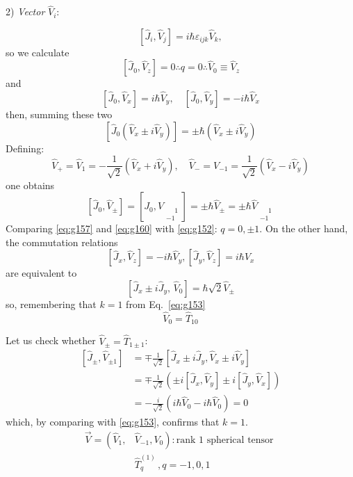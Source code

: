 \documentclass[12pt]{article}
\newcommand{\be}{\begin{equation}}
\newcommand{\ee}{\end{equation}}
\begin{document}

2) \emph{Vector} $\hat{V}_i$:

\[\left[\hat{J}_{i}, \hat{V}_{j}\right]=i \hbar \varepsilon_{i j k} \hat{V}_{k},\]
so we calculate
\be
\left[\hat{J}_{0}, \hat{V}_{z}\right]=0 \therefore q=0 \therefore \hat{V}_{0} \equiv \hat{V}_{z}
\label{eq:g157}
\ee
and
\be
\left[\hat{J}_{0}, \hat{V}_{x}\right]= i \hbar \hat{V}_{y},\quad
\left[\hat{J}_{0}, \hat{V}_{y}\right]=-i \hbar \hat{V}_{x}
\ee
then, summing these two
\be
\left[\hat{J}_{0}\left(\hat{V}_{x} \pm i \hat{V}_{y}\right)\right]=\pm \hbar\left(\hat{V}_{x} \pm i \hat{V}_{y}\right)
\ee
Defining:
\be
\hat{V}_{+}=\hat{V}_{1}=-\frac{1}{\sqrt{2}}\left(\hat{V}_{x}+i \hat{V}_{y}\right), \quad \hat{V}_{-}=V_{-1}=\frac{1}{\sqrt{2}}\left(\hat{V}_{x}-i \hat{V}_{y}\right)
\label{eq:g160}
\ee
one obtains
\be
\left[\hat{J}_{0}, \hat{V}_{\pm}\right]=\left[J_{0}, V_{\substack{\phantom{-}1\\-1}}\right]=\pm \hbar \hat{V}_{\pm}=\pm \hbar \hat{V}_{\substack{\phantom{-}1\\-1}}
\ee
Comparing \eqref{eq:g157} and \eqref{eq:g160} with \eqref{eq:g152}: $\boxed{q=0,\pm 1}$.
On the other hand, the commutation relations
\[
\left[\hat{J}_{x}, \hat{V}_{z}\right]=-i \hbar \hat{V}_{y},\left[\hat{J}_{y}, \hat{V}_{z}\right]=i \hbar \hat{V}_{x}
\]
are equivalent to
\be
\left[\hat{J}_{x} \pm i \hat{J}_{y}, \, \hat{V}_{0}\right]=\hbar \sqrt{2} \hat{V}_{\pm}
\ee
so, remembering that \emph{$k=1$} from Eq.~\eqref{eq:g153}
\be
\boxed{\hat{V}_{0}=\hat{T}_{10}}
\ee


Let us check whether $\hat{V}_{\pm}=\hat{T}_{1 \pm 1}$:
\be
\begin{aligned} 
{\left[\hat{J}_{\pm}, \hat{V}_{\pm 1}\right] } 
&=\mp \frac{1}{\sqrt{2}}\left[\hat{J}_{x} \pm i \hat{J}_{y}, \hat{V}_{x} \pm i \hat{V}_{y}\right] \\ 
&=\mp \frac{1}{\sqrt{2}}\left(\pm i\left[\hat{J}_{x}, \hat{V}_{y}\right] \pm i\left[\hat{J}_{y}, \hat{V}_{x}\right]\right)\\
&=-\frac{i}{\sqrt{2}}\left(i \hbar \hat{V}_{0}-i \hbar \hat{V}_{0}\right)=0 
\end{aligned}
\ee
which, by comparing with \eqref{eq:g153}, confirms that \emph{$k=1$}.
\be
\boxed{
\begin{aligned} 
\vec{V}=\left(\hat{V}_{1},\right.&\left.\hat{V}_{-1}, V_{0}\right): \text {rank 1 spherical tensor } \\ 
& \hat{T}_{q}^{(1)}\,, q=-1,0,1 
\end{aligned}
}
\ee
\end{document}
